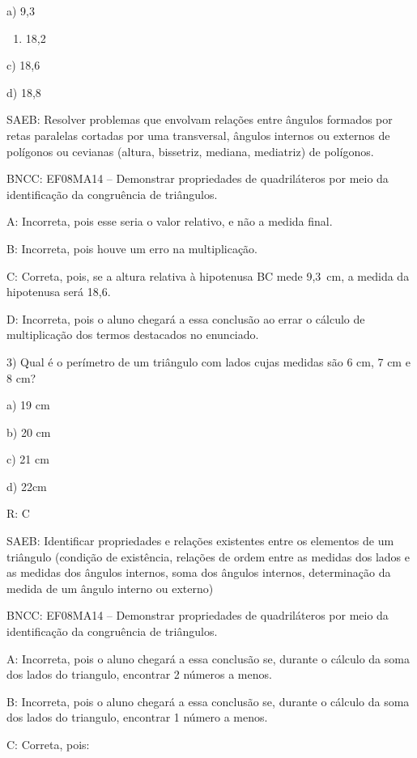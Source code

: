 a) 9,3

\begin{enumerate}
\def\labelenumi{\alph{enumi})}
\setcounter{enumi}{1}
\tightlist
\item
  18,2
\end{enumerate}

c) 18,6

d) 18,8

SAEB: Resolver problemas que envolvam relações entre ângulos formados
por retas paralelas cortadas por uma transversal, ângulos internos ou
externos de polígonos ou cevianas (altura, bissetriz, mediana,
mediatriz) de polígonos.

BNCC: EF08MA14 -- Demonstrar propriedades de quadriláteros por meio da
identificação da congruência de triângulos.

A: Incorreta, pois esse seria o valor relativo, e não a medida final.

B: Incorreta, pois houve um erro na multiplicação.

C: Correta, pois, se a altura relativa à hipotenusa BC mede 9,3~cm, a
medida da hipotenusa será 18,6.

D: Incorreta, pois o aluno chegará a essa conclusão ao errar o cálculo
de multiplicação dos termos destacados no enunciado.

3) Qual é o perímetro de um triângulo com lados cujas medidas são 6 cm,
7 cm e 8 cm?

a) 19 cm

b) 20 cm

c) 21 cm

d) 22cm

R: C

SAEB: Identificar propriedades e relações existentes entre os elementos
de um triângulo (condição de existência, relações de ordem entre as
medidas dos lados e as medidas dos ângulos internos, soma dos ângulos
internos, determinação da medida de um ângulo interno ou externo)

BNCC: EF08MA14 -- Demonstrar propriedades de quadriláteros por meio da
identificação da congruência de triângulos.

A: Incorreta, pois o aluno chegará a essa conclusão se, durante o
cálculo da soma dos lados do triangulo, encontrar 2 números a menos.

B: Incorreta, pois o aluno chegará a essa conclusão se, durante o
cálculo da soma dos lados do triangulo, encontrar 1 número a menos.

C: Correta, pois:

